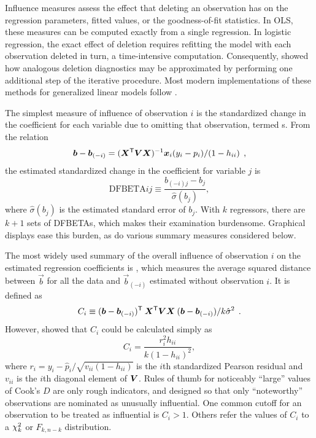 \documentclass[11pt]{book}\usepackage[]{graphicx}\usepackage[]{color}
\begin{document}
Influence measures assess the effect that deleting an
observation has on the regression parameters, fitted values, or the
goodness-of-fit statistics.  In OLS, these measures
can be computed exactly from a single regression.
In logistic regression, the exact effect of deletion
requires refitting the model with each observation deleted in turn,
a time-intensive computation.
Consequently, \citet{Pregibon:81} showed how analogous deletion
diagnostics may be approximated by performing one additional step
of the iterative procedure.  Most modern implementations of these
methods for generalized linear models follow \citet{Williams:87}.

The simplest measure of influence of observation $i$ is the standardized change in the coefficient for each variable due to omitting that observation,
termed s.  From the relation \citep[p. 716]{Pregibon:81}
\begin{equation*}%
 \vec{b} -  \vec{b}_{(-i)} = (\mat{X}\trans \mat{V} \mat{X})^{-1} \vec{x}_i (y_i - p_i) / (1 - h_{ii})
 \comma
\end{equation*}
the estimated standardized change in the coefficient for variable $j$ is
\begin{equation}\label{eq:dfbeta}
 \mbox{DFBETA}{ij} \equiv \frac{b_{(-i)j} -  b_j } {\hat{\sigma} (b_j)}
 \comma
\end{equation}
where $\hat{\sigma} (b_j)$ is the estimated standard error of $b_j$.
With $k$ regressors, there are $k+1$ sets of DFBETAs, which makes their examination burdensome.
Graphical displays ease this burden, as do various summary measures
considered below.

The most widely used summary of the
overall influence of observation $i$ on the estimated regression
coefficients is , which measures
the average squared distance between $\vec{b}$ for all the data and
$\vec{b}_{(-i)}$ estimated without observation $i$.
It is defined as 
\begin{equation*}%
C_i \equiv ( \vec{b} - \vec{b}_{(-i)} )\trans \:
    \mat{X}\trans \mat{V} \mat{X} \:
     ( \vec{b} - \vec{b}_{(-i)} ) / k \hat{\sigma}^2
    \period
\end{equation*}
However, \citet{Pregibon:81} showed that $C_i$ could be calculated
simply as
\begin{equation}\label{eq:cookd2}
 C_i = \frac{r_i^2 h_{ii}} {k (1-h_{ii} )^2}
 \comma
\end{equation}
where $r_i = y_i - \hat{p}_i / \sqrt{v_{ii} (1-h_{ii})}$ is the
$i$th standardized Pearson residual and $v_{ii}$ is the
$i$th diagonal element of $\bm{V}$.
Rules of thumb for noticeably ``large'' values of Cook's $D$ 
are only rough indicators, and designed so that only
``noteworthy'' observations are nominated as unusually influential.
One common cutoff for an observation to be treated as influential
is $C_i > 1$. Others refer the values of $C_i$ to a 
$\chi^2_k$ or $F_{k, n-k}$ distribution.
\end{document}
